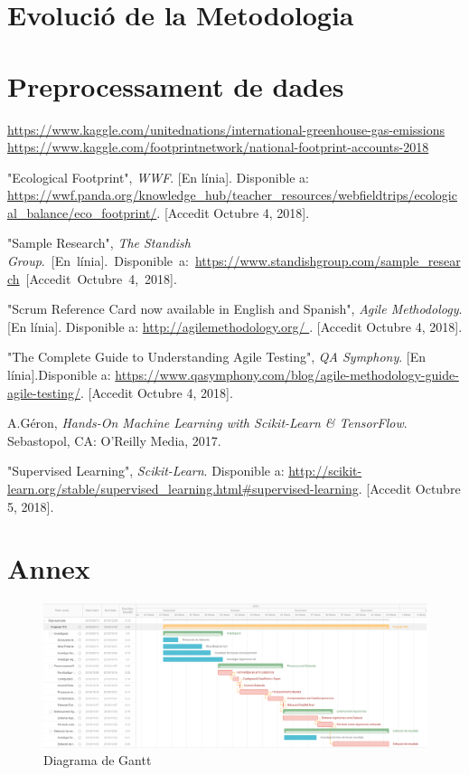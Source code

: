 \documentclass[10pt,a4paper,twocolumn,twoside]{article}
\begin{document}
\section{Evolució de la Metodologia}

\section{Preprocessament de dades}

\begin{thebibliography}{11}
\url{https://www.kaggle.com/unitednations/international-greenhouse-gas-emissions}
\url{https://www.kaggle.com/footprintnetwork/national-footprint-accounts-2018}

"Ecological Footprint", \textit{WWF}. [En línia]. Disponible a: \url{https://wwf.panda.org/knowledge_hub/teacher_resources/webfieldtrips/ecological_balance/eco_footprint/}. [Accedit Octubre 4, 2018].
 
"Sample Research", \textit{The Standish Group}.~[En~línia].~Disponible~a:~\url{https://www.standishgroup.com/sample_research}~[Accedit~Octubre~4,~2018].

"Scrum Reference Card now available in English and Spanish",  \textit{Agile Methodology}. [En línia]. Disponible a: \url{http://agilemethodology.org/ }. [Accedit Octubre 4, 2018].

"The Complete Guide to Understanding Agile Testing", \textit{QA Symphony}. [En línia].Disponible a: \url{https://www.qasymphony.com/blog/agile-methodology-guide-agile-testing/}. [Accedit Octubre 4, 2018].

A.Géron, \textit{Hands-On Machine Learning with Scikit-Learn \& TensorFlow}. Sebastopol, CA: O’Reilly Media, 2017.

"Supervised Learning", \textit{Scikit-Learn}. Disponible a: \url{http://scikit-learn.org/stable/supervised_learning.html#supervised-learning}. [Accedit Octubre 5, 2018].
\end{thebibliography}
\clearpage
\section{Annex}

\begin{figure}[!h]
\centering
	\includegraphics[width=1\textwidth]{img/diagrama_Gantt}

	\caption{Diagrama de Gantt}
	\label{fig-Gantt}
\end{figure}
\end{document}
